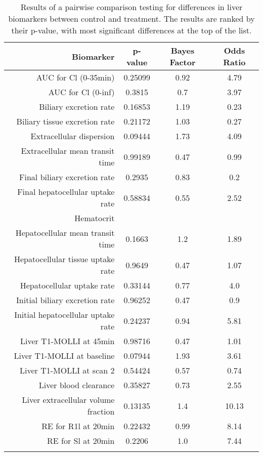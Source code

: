 \documentclass{epflreport}%
\begin{document}
%
\begin{longtable}{rccc}%
\hline%
Biomarker&p{-}value&Bayes Factor&Odds Ratio\\%
\hline%
AUC for Cl (0{-}35min)&0.25099&0.92&4.79\\%
AUC for Cl (0{-}inf)&0.3815&0.7&3.97\\%
Biliary excretion rate&0.16853&1.19&0.23\\%
Biliary tissue excretion rate&0.21172&1.03&0.27\\%
Extracellular dispersion&0.09444&1.73&4.09\\%
Extracellular mean transit time&0.99189&0.47&0.99\\%
Final biliary excretion rate&0.2935&0.83&0.2\\%
Final hepatocellular uptake rate&0.58834&0.55&2.52\\%
Hematocrit&&&\\%
Hepatocellular mean transit time&0.1663&1.2&1.89\\%
Hepatocellular tissue uptake rate&0.9649&0.47&1.07\\%
Hepatocellular uptake rate&0.33144&0.77&4.0\\%
Initial biliary excretion rate&0.96252&0.47&0.9\\%
Initial hepatocellular uptake rate&0.24237&0.94&5.81\\%
Liver T1{-}MOLLI at 45min&0.98716&0.47&1.01\\%
Liver T1{-}MOLLI at baseline&0.07944&1.93&3.61\\%
Liver T1{-}MOLLI at scan 2&0.54424&0.57&0.74\\%
Liver blood clearance&0.35827&0.73&2.55\\%
Liver extracellular volume fraction&0.13135&1.4&10.13\\%
RE for R1l at 20min&0.22432&0.99&8.14\\%
RE for Sl at 20min&0.2206&1.0&7.44\\%
\hline%
\caption{Results of a pairwise comparison testing for differences in liver biomarkers between control and treatment. The results are ranked by their p-value, with most significant differences at the top of the list.} \\%
\end{longtable}%
\end{document}
